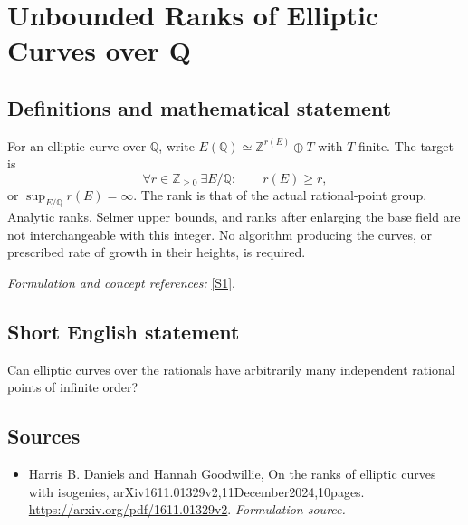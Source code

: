 \documentclass[11pt]{article}
\begin{document}
\section*{\texorpdfstring{Unbounded Ranks of Elliptic Curves over Q}{Unbounded Ranks of Elliptic Curves over Q}}\label{107}
\subsection{Definitions and mathematical statement}
For an elliptic curve over ${\mathbb{Q}}$, write $E({\mathbb{Q}})\simeq{\mathbb{Z}}^{r(E)}\oplus T$ with $T$ finite. The target is
\[
 \forall r\in{\mathbb{Z}}_{\ge0}\ \exists E/{\mathbb{Q}}:\qquad r(E)\ge r,
\]
or $\sup_{E/{\mathbb{Q}}}r(E)=\infty$. The rank is that of the actual rational-point group. Analytic ranks, Selmer upper bounds, and ranks after enlarging the base field are not interchangeable with this integer. No algorithm producing the curves, or prescribed rate of growth in their heights, is required.
\par\smallskip\textit{Formulation and concept references:} \href{https://arxiv.org/pdf/1611.01329v2}{[S1]}.

\subsection{Short English statement}
Can elliptic curves over the rationals have arbitrarily many independent rational points of infinite order?
\subsection{Sources}
\begin{itemize}
\item[S1]Harris B. Daniels and Hannah Goodwillie, On the ranks of elliptic curves with isogenies, arXiv1611.01329v2,11December2024,10pages.
\url{https://arxiv.org/pdf/1611.01329v2}.
\textit{Formulation source.}
\end{itemize}
\end{document}
